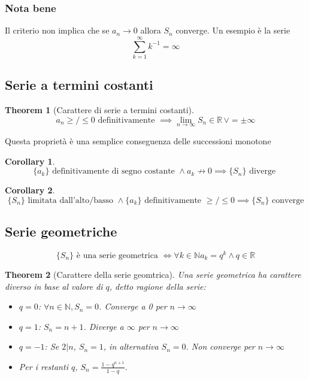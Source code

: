 \documentclass{article}
\newtheorem{theorem}{Theorem}[section]
\newtheorem{corollary}{Corollary}[theorem]
\begin{document}
        \subsubsection{Nota bene}
            Il criterio non implica che se $a_n \to 0$ allora $S_n$ converge. Un esempio è la serie 
            $$\sum_{k=1}^\infty k^{-1} = \infty$$
    \subsection{Serie a termini costanti}
        \begin{theorem}[Carattere di serie a termini costanti]
            $$a_n \geq/\leq 0 \textrm{ definitivamente } \implies \lim_{n \to \infty} S_n \in \mathbb{R} \, \lor = \pm \infty$$
        \end{theorem}
        Questa proprietà è una semplice conseguenza delle successioni monotone
        \begin{corollary}
            $$\{a_k\} \textrm{ definitivamente di segno costante } \land a_k \not\to 0 \implies \{S_n\} \textrm{ diverge }$$
        \end{corollary}
        \begin{corollary}
            $$\{S_n\} \textrm{ limitata dall'alto/basso } \land \{a_k\} \textrm{ definitivamente } \geq/\leq 0 \implies \{S_n\} \textrm{ converge}$$
        \end{corollary}
    \subsection{Serie geometriche}
        $$\{S_n\} \textrm{ è una serie geometrica } \iff \forall k \in \mathbb{N} a_k = q^k \land q \in \mathbb{R}$$
        \begin{theorem}[Carattere della serie geomtrica]
            Una serie geometrica ha carattere diverso in base al valore di $q$, detto ragione della serie:
            \begin{itemize}
                \item $q = 0$: $\forall n \in \mathbb{N}, S_n = 0$. Converge a 0 per $n \to \infty$
                \item $q = 1$: $S_n = n + 1$. Diverge a $\infty$ per $n \to \infty$
                \item $q = -1$: Se $2 | n$, $S_n = 1$, in alternativa $S_n = 0$. Non converge per $n \to \infty$
                \item Per i restanti $q$, $S_n = \frac{1-q^{n+1}}{1-q}$. 
            \end{itemize}
        \end{theorem}
\end{document}
